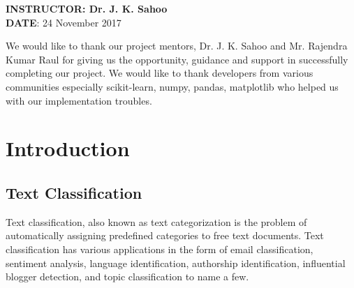\documentclass[a4paper, 14pt]{article}
\begin{document}
\flushleft \textbf{INSTRUCTOR: Dr. J. K. Sahoo}
\\
\textbf{DATE}: 24 November 2017
 


\begin{flushleft}
\justify \large{
We would like to thank our project mentors, Dr. J. K. Sahoo and Mr. Rajendra Kumar Raul for giving us the opportunity, guidance and support in successfully completing our project. We would like to thank developers from various communities especially scikit-learn, numpy, pandas, matplotlib who helped us with our implementation troubles.
}
\end{flushleft}

 

\clearpage

\tableofcontents
 
\clearpage
\section{Introduction}


\subsection{Text Classification}
\begin{justify}
Text classification, also known as text categorization is the problem of automatically assigning predefined categories to free text documents.
Text classification has various applications in the form of email classification, sentiment analysis, language identification, authorship identification, influential blogger detection, and topic classification to name a few.

\end{justify}
\end{document}
